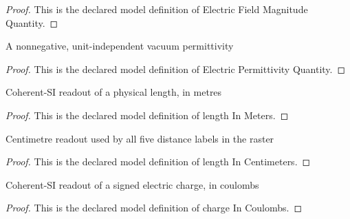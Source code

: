 \begin{proof}
  This is the declared model definition of Electric Field Magnitude Quantity.
\end{proof}
\begin{definition}
  \label{def:physics:phyx-mini-0852:phyxminiproblems-problemphyxmini0852-electricpermittivityquantity}
  A nonnegative, unit-independent vacuum permittivity
\end{definition}
\begin{proof}
  This is the declared model definition of Electric Permittivity Quantity.
\end{proof}
\begin{definition}
  \label{def:physics:phyx-mini-0852:phyxminiproblems-problemphyxmini0852-lengthinmeters}
  Coherent-SI readout of a physical length, in metres
\end{definition}
\begin{proof}
  This is the declared model definition of length In Meters.
\end{proof}
\begin{definition}
  \label{def:physics:phyx-mini-0852:phyxminiproblems-problemphyxmini0852-lengthincentimeters}
  Centimetre readout used by all five distance labels in the raster
\end{definition}
\begin{proof}
  This is the declared model definition of length In Centimeters.
\end{proof}
\begin{definition}
  \label{def:physics:phyx-mini-0852:phyxminiproblems-problemphyxmini0852-chargeincoulombs}
  Coherent-SI readout of a signed electric charge, in coulombs
\end{definition}
\begin{proof}
  This is the declared model definition of charge In Coulombs.
\end{proof}
